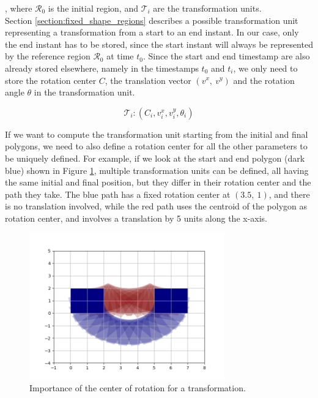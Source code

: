 , where $\mathcal{R}_0$ is the initial region, and $\mathcal{T}_i$ are the transformation units. \\

Section \ref{section:fixed_shape_regions} describes a possible transformation unit representing a transformation from a start to an end instant. In our case, only the end instant has to be stored, since the start instant will always be represented by the reference region $\mathcal{R}_0$ at time $t_{0}$. Since the start and end timestamp are also already stored elsewhere, namely in the timestamps $t_0$ and $t_i$, we only need to store the rotation center $C$, the translation vector $(v^x,\ v^y)$ and the rotation angle $\theta$ in the transformation unit.

\[
    \mathcal{T}_i: (C_i, v_i^x, v_i^y, \theta_i)
\]

If we want to compute the transformation unit starting from the initial and final polygons, we need to also define a rotation center for all the other parameters to be uniquely defined. For example, if we look at the start and end polygon (dark blue) shown in Figure \ref{fig:center_of_rotation}, multiple transformation units can be defined, all having the same initial and final position, but they differ in their rotation center and the path they take. The blue path has a fixed rotation center at $(3.5,\ 1)$, and there is no translation involved, while the red path uses the centroid of the polygon as rotation center, and involves a translation by 5 units along the x-axis.

\begin{figure}[h!]
    \centering
    \includegraphics[width=0.75\textwidth]{images/center_of_rotation_importance.png}
    \caption{Importance of the center of rotation for a transformation.}
    \label{fig:center_of_rotation}
\end{figure}


